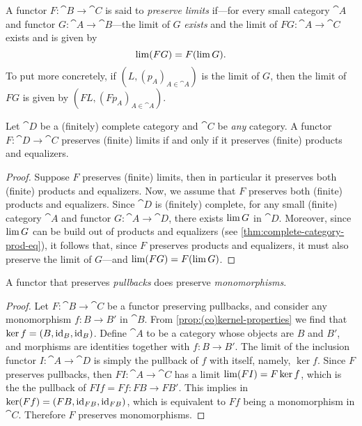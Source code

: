 \begin{definition}
\label{def:limit-preserving-functor}
A functor \(F: \cat B \to \cat C\) is said to \emph{preserve limits} if---for
every small category \(\cat A\) and functor \(G: \cat A \to \cat B\)---the
limit of \(G\) \emph{exists} and the limit of \(F G: \cat A \to \cat C\) exists
and is given by
\[
\operatorname{lim}(F G) = F(\operatorname{lim} G).
\]
To put more concretely, if \((L, (p_A)_{A \in \cat A})\) is the limit of \(G\),
then the limit of \(F G\) is given by \((F L, (F p_A)_{A \in \cat A})\).
\end{definition}

\begin{proposition}
\label{prop:fin-complete-cat-func-preserves-iff-prod-eq}
Let \(\cat D\) be a (finitely) complete category and \(\cat C\) be \emph{any}
category. A functor \(F: \cat D \to \cat C\) preserves (finite) limits if and
only if it preserves (finite) products and equalizers.
\end{proposition}

\begin{proof}
Suppose \(F\) preserves (finite) limits, then in particular it preserves both
(finite) products and equalizers. Now, we assume that \(F\) preserves both
(finite) products and equalizers. Since \(\cat D\) is (finitely) complete, for
any small (finite) category \(\cat A\) and functor \(G: \cat A \to \cat D\),
there exists \(\operatorname{lim} G\) in \(\cat D\). Moreover, since \(\operatorname{lim} G\) can be build
out of products and equalizers (see \cref{thm:complete-category-prod-eq}), it
follows that, since \(F\) preserves products and equalizers, it must also
preserve the limit of \(G\)---and \(\operatorname{lim}(FG) = F(\operatorname{lim} G)\).
\end{proof}

\begin{proposition}
\label{prop:preserve-pullback-then-mono}
A functor that preserves \emph{pullbacks} does preserve \emph{monomorphisms}.
\end{proposition}

\begin{proof}
Let \(F: \cat B \to \cat C\) be a functor preserving pullbacks, and consider any
monomorphism \(f: B \to B'\) in \(\cat B\). From
\cref{prop:(co)kernel-properties} we find that \(\ker f = (B, \operatorname{id}_B,
\operatorname{id}_B)\). Define \(\cat A\) to be a category whose objects are \(B\) and \(B'\),
and morphisms are identities together with \(f: B \to B'\). The limit of the
inclusion functor \(I: \cat A \to \cat D\) is simply the pullback of \(f\) with
itself, namely, \(\ker f\). Since \(F\) preserves pullbacks, then
\(F I: \cat A \to \cat C\) has a limit \(\operatorname{lim} (F I) = F \ker f\), which is the
the pullback of \(F I f = F f: F B \to F B'\). This implies in
\(\ker(F f) = (F B, \operatorname{id}_{F B}, \operatorname{id}_{F B})\), which is equivalent to \(F f\)
being a monomorphism in \(\cat C\). Therefore \(F\) preserves monomorphisms.
\end{proof}

